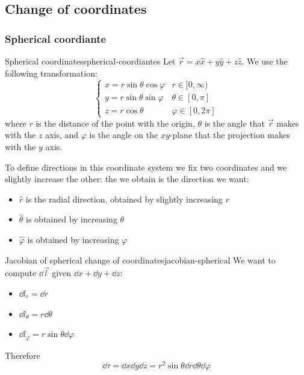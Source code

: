 \documentclass[12pt]{extarticle}
\begin{document}
\subsection{Change of coordinates}

\subsubsection{Spherical coordiante}

\begin{definition}{Spherical coordinates}{spherical-coordiantes}
    Let $\vec r = x \hat x + y \hat y + z \hat z$.
    We use the following transformation:
    \begin{equation}
        \begin{cases}
            x = r \sin \theta \cos \varphi & r \in [0, \infty)     \\
            y = r \sin \theta \sin \varphi & \theta \in [0, \pi]   \\
            z = r \cos \theta              & \varphi \in [0, 2\pi]
        \end{cases}
    \end{equation}
    where $r$ is the distance of the point with the origin, $\theta$ is the angle that $\vec r$ makes with the $z$ axis, and $\varphi$ is the angle on the $xy$-plane that the projection makes with the $y$ axis.
\end{definition}

To define directions in this coordinate system we fix two coordinates and we slightly increase the other: the  we obtain is the direction we want:
\begin{itemize}
    \item $\hat r$ is the radial direction, obtained by slightly increasing $r$
    \item $\hat \theta$ is obtained by increasing $\theta$
    \item $\hat \varphi$ is obtained by increasing $\varphi$
\end{itemize}

\begin{proposition}{Jacobian of spherical change of coordinates}{jacobian-spherical}
    We want to compute $\dd{\vec l}$ given $\dd{x} + \dd{y} + \dd{z}$:
    \begin{itemize}
        \item $\dd{l}_r = \dd{r}$
        \item $\dd{l}_\theta = r \dd{\theta}$
        \item $\dd{l}_\varphi = r \sin \theta \dd{\varphi}$
    \end{itemize}

    Therefore
    \begin{equation}
        \dd{\tau} = \dd{x} \dd{y} \dd{z} = r^2 \sin \theta \dd{r} \dd{\theta} \dd{\varphi}
    \end{equation}
\end{proposition}
\end{document}
